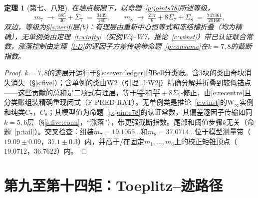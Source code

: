 \documentclass[11pt]{article}
\numberwithin{equation}{section}
\newtheorem{theorem}{定理}[section]
\theoremstyle{definition}
\theoremstyle{remark}
\begin{document}
\begin{theorem}[第七、八矩]\label{t:m78}
在端点极限下，以命题~\ref{p:joints78}所述等级，
\[
m_7\;\to\;\tfrac{685}{36}+\Sigma_7\;=\;\tfrac{3439}{180},
\qquad
m_8\;\to\;\tfrac{217}6+8\Sigma_7+\Sigma_8\;=\;\tfrac{747361}{20160},
\]
双边，等级为\S\ref{s:verif}层(b)：有理层由重新中心恒等式和冻结槽折叠（均为精确），无单例类由定理~\ref{t:winfty}（实例W4--W7，推论~\ref{c:winst}）带已认证联合常数，涨落控制由定理~\ref{t:D}的逐因子方差传输带命题~\ref{p:consume}在$k=7,8$的截断指数。
\end{theorem}

\begin{proof}
$k=7,8$的迹展开运行于\S\ref{s:seven:ledger}的Bell分类账。含$3$块的类由奇块消失消失（\S\ref{s:five}）；含单例的类由W2（引理~\ref{l:W2}）精确分解并折叠到较低锚点——这些贡献的总和是二项式有理层，等于$\tfrac{685}{36}$和$\tfrac{217}6+8\Sigma_7$-修正，由\eqref{e:recentre}且分类账组装精确重现闭式（F-PRED-RAT）。无单例类是推论~\ref{c:winst}的W$_\infty$实例和纯类$C_7$，$C_8$；其模型值为命题~\ref{p:joints78}的认证常数，其偏差逐因子传输如同$k=5,6$层（\S\ref{s:five:conn}，“涨落”），带更强截断指数。尾部和阈值步骤$k$无关（命题~\ref{p:tail}）。交叉检查：组装$m_7=19.1055\ldots$和$m_8=37.0714\ldots$位于模型测量带（$19.09\pm0.09$，$37.1\pm0.3$）内，并高于/在固定$m_1,\dots,m_6$上的校正矩锥顶点（$19.0712$，$36.7622$）内。
\end{proof}

\section{第九至第十四矩：Toeplitz--迹路径}\label{s:tt}
\end{document}
